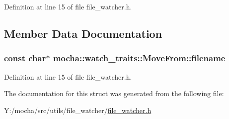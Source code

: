 Definition at line 15 of file file\_\-watcher.h.



\subsection{Member Data Documentation}
\hypertarget{structmocha_1_1watch__traits_1_1_move_from_a40c6aeea73ee1615afa255e6723e43e8}{
\subsubsection[{filename}]{\setlength{\rightskip}{0pt plus 5cm}const char$\ast$ {\bf mocha::watch\_\-traits::MoveFrom::filename}}}
\label{structmocha_1_1watch__traits_1_1_move_from_a40c6aeea73ee1615afa255e6723e43e8}


Definition at line 15 of file file\_\-watcher.h.



The documentation for this struct was generated from the following file:\begin{DoxyCompactItemize}
\item 
Y:/mocha/src/utils/file\_\-watcher/\hyperlink{file__watcher_8h}{file\_\-watcher.h}\end{DoxyCompactItemize}
